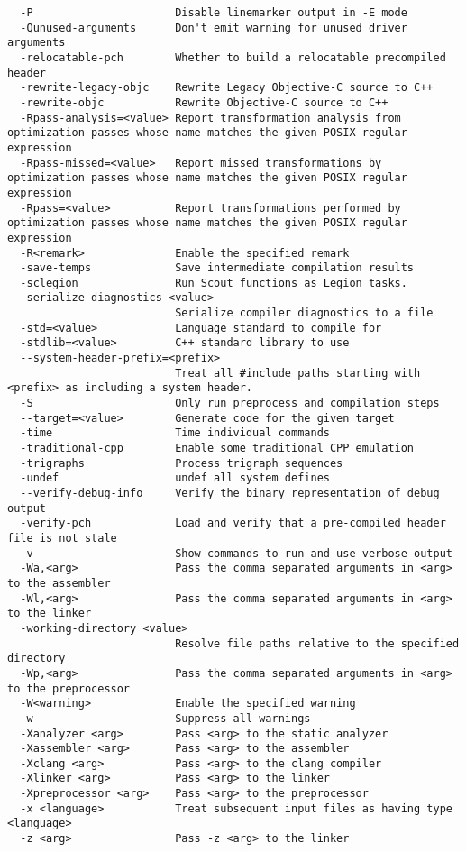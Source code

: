 \begin{verbatim}
  -P                      Disable linemarker output in -E mode
  -Qunused-arguments      Don't emit warning for unused driver arguments
  -relocatable-pch        Whether to build a relocatable precompiled header
  -rewrite-legacy-objc    Rewrite Legacy Objective-C source to C++
  -rewrite-objc           Rewrite Objective-C source to C++
  -Rpass-analysis=<value> Report transformation analysis from optimization passes whose name matches the given POSIX regular expression
  -Rpass-missed=<value>   Report missed transformations by optimization passes whose name matches the given POSIX regular expression
  -Rpass=<value>          Report transformations performed by optimization passes whose name matches the given POSIX regular expression
  -R<remark>              Enable the specified remark
  -save-temps             Save intermediate compilation results
  -sclegion               Run Scout functions as Legion tasks.
  -serialize-diagnostics <value>
                          Serialize compiler diagnostics to a file
  -std=<value>            Language standard to compile for
  -stdlib=<value>         C++ standard library to use
  --system-header-prefix=<prefix>
                          Treat all #include paths starting with <prefix> as including a system header.
  -S                      Only run preprocess and compilation steps
  --target=<value>        Generate code for the given target
  -time                   Time individual commands
  -traditional-cpp        Enable some traditional CPP emulation
  -trigraphs              Process trigraph sequences
  -undef                  undef all system defines
  --verify-debug-info     Verify the binary representation of debug output
  -verify-pch             Load and verify that a pre-compiled header file is not stale
  -v                      Show commands to run and use verbose output
  -Wa,<arg>               Pass the comma separated arguments in <arg> to the assembler
  -Wl,<arg>               Pass the comma separated arguments in <arg> to the linker
  -working-directory <value>
                          Resolve file paths relative to the specified directory
  -Wp,<arg>               Pass the comma separated arguments in <arg> to the preprocessor
  -W<warning>             Enable the specified warning
  -w                      Suppress all warnings
  -Xanalyzer <arg>        Pass <arg> to the static analyzer
  -Xassembler <arg>       Pass <arg> to the assembler
  -Xclang <arg>           Pass <arg> to the clang compiler
  -Xlinker <arg>          Pass <arg> to the linker
  -Xpreprocessor <arg>    Pass <arg> to the preprocessor
  -x <language>           Treat subsequent input files as having type <language>
  -z <arg>                Pass -z <arg> to the linker
\end{verbatim}


